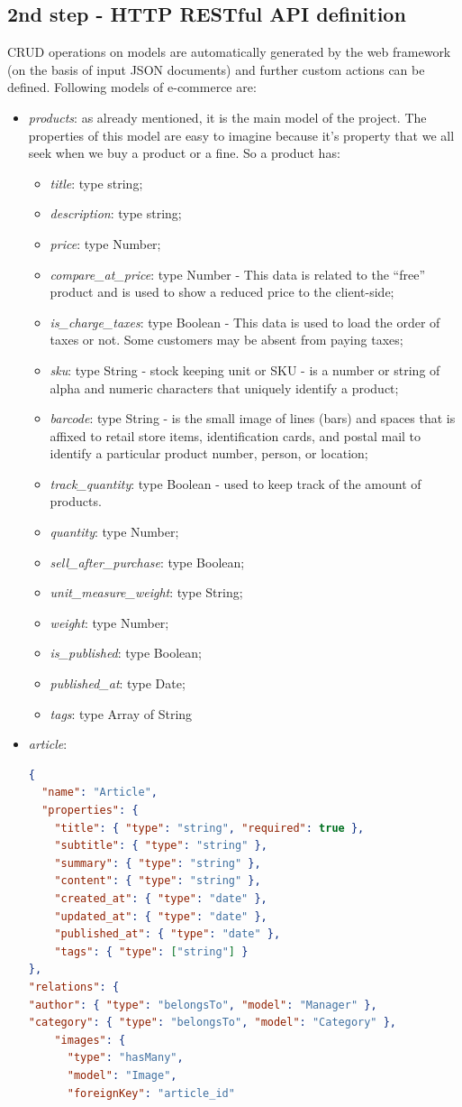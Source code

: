 \subsection{2nd step - HTTP RESTful API definition}
CRUD operations on models are automatically generated by the web framework (on the basis of input JSON documents) and further custom actions can be defined. Following models of e-commerce are:
\begin{itemize}
\item \emph{products}: as already mentioned, it is the main model of the project. The properties of this model are easy to imagine because it's property that we all seek when we buy a product or a fine. So a product has:
\begin{itemize}
\item \emph{title}: type string;
\item \emph{description}: type string;
\item \emph{price}: type Number;
\item \emph{compare\_at\_price}: type Number - This data is related to the “free” product and is used to show a reduced price to the client-side;
\item \emph{is\_charge\_taxes}: type Boolean - This data is used to load the order of taxes or not. Some customers may be absent from paying taxes;
\item \emph{sku}: type String - stock keeping unit or SKU - is a number or string of alpha and numeric characters that uniquely identify a product;
\item \emph{barcode}: type String - is the small image of lines (bars) and spaces that is affixed to retail store items, identification cards, and postal mail to identify a particular product number, person, or location;
\item \emph{track\_quantity}: type Boolean - used to keep track of the amount of products.
\item \emph{quantity}: type Number;
\item \emph{sell\_after\_purchase}: type Boolean;
\item \emph{unit\_measure\_weight}: type String;
\item \emph{weight}: type Number;
\item \emph{is\_published}: type Boolean;
\item \emph{published\_at}: type Date;
\item \emph{tags}: type Array of String
\end{itemize}
\item \emph{article}:
\begin{lstlisting}[language=json]
{
  "name": "Article",
  "properties": {
    "title": { "type": "string", "required": true },
    "subtitle": { "type": "string" },
    "summary": { "type": "string" },
    "content": { "type": "string" },
    "created_at": { "type": "date" },
    "updated_at": { "type": "date" },
    "published_at": { "type": "date" },
    "tags": { "type": ["string"] }
},
"relations": {
"author": { "type": "belongsTo", "model": "Manager" },
"category": { "type": "belongsTo", "model": "Category" },
    "images": {
      "type": "hasMany",
      "model": "Image",
      "foreignKey": "article_id"


\end{lstlisting}
\end{itemize}
